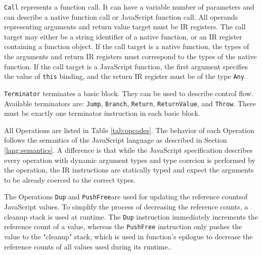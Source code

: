 \texttt{Call} represents a function call. It can have a variable number of parameters and can describe a native function call or JavaScript function call. All operands representing arguments and return value target must be IR registers. The call target may either be a string identifier of a native function, or an IR register containing a function object. If the call target is a native function, the types of the arguments and return IR registers must correspond to the types of the native function. If the call target is a JavaScript function, the first argument specifies the value of \texttt{this} binding, and the return IR register must be of the type \texttt{Any}.

\texttt{Terminator} terminates a basic block. They can be used to describe control flow. Available terminators are: \texttt{Jump}, \texttt{Branch}, \texttt{Return}, \texttt{ReturnValue}, and \texttt{Throw}. There must be exactly one terminator instruction in each basic block.

All Operations are listed in Table \ref{tab:opcodes}. The behavior of each Operation follows the semantics of the JavaScript language as described in Section \ref{lang:semantics}. A difference is that while the JavaScript specification describes every operation with dynamic argument types and type coercion is performed by the operation, the IR instructions are statically typed and expect the arguments to be already coerced to the correct types.

The Operations \texttt{Dup} and \texttt{PushFree}\footnotemark[1] are used for updating the reference counts\footnotemark[2] of JavaScript values. To simplify the process of decreasing the reference counts, a cleanup stack is used at runtime. The \texttt{Dup} instruction immediately increments the reference count of a value, whereas the \texttt{PushFree} instruction only pushes the value to the "cleanup" stack, which is used in function's epilogue to decrease the reference counts of all values used during its runtime..




